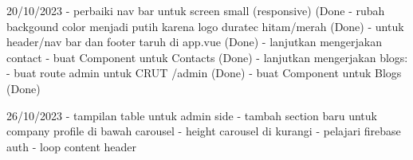 20/10/2023
    - perbaiki nav bar untuk screen small (responsive) (Done
    - rubah backgound color menjadi putih karena logo duratec hitam/merah (Done)
    - untuk header/nav bar dan footer taruh di app.vue (Done)
    - lanjutkan mengerjakan contact
         - buat Component untuk Contacts (Done)
    - lanjutkan mengerjakan blogs:
        - buat route admin untuk CRUT   /admin (Done)
        - buat Component untuk Blogs (Done)
    
26/10/2023
   - tampilan table untuk admin side
   - tambah section baru untuk company profile di bawah carousel
   - height carousel di kurangi
   - pelajari firebase auth
   - loop content header
